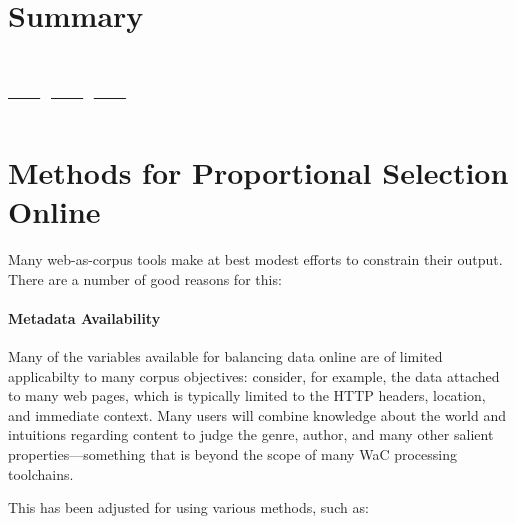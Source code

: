 \section{Summary}













\section{--- --- ---}
% 
% 
% 
% 
\section{Methods for Proportional Selection Online}
Many web-as-corpus tools make at best modest efforts to constrain their output.  There are a number of good reasons for this:

\paragraph{Metadata Availability}
Many of the variables available for balancing data online are of limited applicabilty to many corpus objectives: consider, for example, the data attached to many web pages, which is typically limited to the HTTP headers, location, and immediate context.  Many users will combine knowledge about the world and intuitions regarding content to judge the genre, author, and many other salient properties---something that is beyond the scope of many WaC processing toolchains.

This has been adjusted for using various methods, such as:

